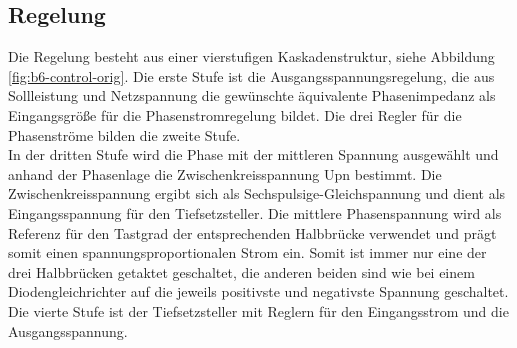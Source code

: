 		\subsection{Regelung}
			Die Regelung besteht aus einer vierstufigen Kaskadenstruktur, siehe Abbildung \ref{fig:b6-control-orig}. Die erste Stufe ist die Ausgangsspannungsregelung, die aus Sollleistung und Netzspannung die gewünschte äquivalente Phasenimpedanz als Eingangsgröße für die Phasenstromregelung bildet. Die drei Regler für die Phasenströme bilden die zweite Stufe.\\
			In der dritten Stufe wird die Phase mit der mittleren Spannung ausgewählt und anhand der Phasenlage die Zwischenkreisspannung \gls{Upn} bestimmt. Die Zwischenkreisspannung ergibt sich als Sechspulsige-Gleichspannung und dient als Eingangsspannung für den Tiefsetzsteller. Die mittlere Phasenspannung wird als Referenz für den Tastgrad der entsprechenden Halbbrücke verwendet und prägt somit einen spannungsproportionalen Strom ein. Somit ist immer nur eine der drei Halbbrücken getaktet geschaltet, die anderen beiden sind wie bei einem Diodengleichrichter auf die jeweils positivste und negativste Spannung geschaltet. Die vierte Stufe ist der Tiefsetzsteller mit Reglern für den Eingangsstrom und die Ausgangsspannung.
				
